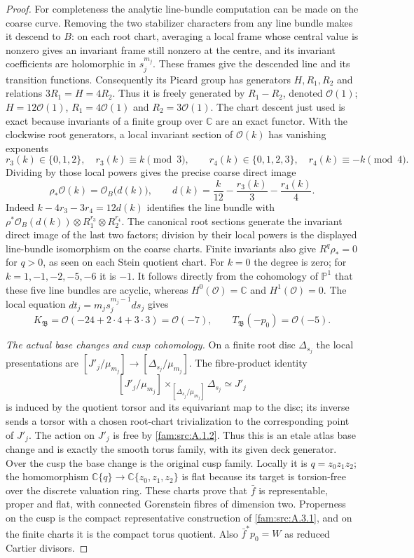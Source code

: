 \begin{proof}
For completeness the analytic line-bundle computation can be made on
the coarse curve. Removing the two stabilizer characters from any line
bundle makes it descend to $B$: on each root chart, averaging a local
frame whose central value is nonzero gives an invariant frame still
nonzero at the centre, and its invariant coefficients are holomorphic
in $s_j^{m_j}$. These frames give the descended line and its transition
functions. Consequently its Picard group has
generators $H,R_1,R_2$ and relations $3R_1=H=4R_2$.
Thus it is freely generated by $R_1-R_2$, denoted $\mathcal O(1)$;
$H=12\mathcal O(1)$, $R_1=4\mathcal O(1)$ and
$R_2=3\mathcal O(1)$. The chart descent just used is exact because
invariants of a finite group over $\mathbb C$ are an exact functor.
With the clockwise root generators, a local invariant section of
$\mathcal O(k)$ has vanishing exponents
\[
 r_3(k)\in\{0,1,2\},\quad r_3(k)\equiv k\pmod3,
 \qquad
 r_4(k)\in\{0,1,2,3\},\quad r_4(k)\equiv-k\pmod4.
\]
Dividing by those local powers gives the precise coarse direct image
\begin{equation}\label{fam:eq:ab-root-degree}
 \rho_*\mathcal O(k)=\mathcal O_B\bigl(d(k)\bigr),\qquad
 d(k)=\frac{k}{12}-\frac{r_3(k)}3-\frac{r_4(k)}4.
\end{equation}
Indeed $k-4r_3-3r_4=12d(k)$ identifies the line bundle with
$\rho^*\mathcal O_B(d(k))\otimes R_1^{r_3}\otimes R_2^{r_4}$.
The canonical root sections generate the invariant direct image of
the last two factors; division by their local powers is the displayed
line-bundle isomorphism on the coarse charts. Finite invariants also give
$R^q\rho_*=0$ for $q>0$, as seen on each Stein quotient chart.
For $k=0$ the degree is zero; for
$k=1,-1,-2,-5,-6$ it is $-1$. It follows directly from the
cohomology of $\mathbb P^1$ that these five line bundles are acyclic,
whereas $H^0(\mathcal O)=\mathbb C$ and $H^1(\mathcal O)=0$.
The local equation $dt_j=m_js_j^{m_j-1}ds_j$ gives
\[
 K_{\mathfrak B}=\mathcal O(-24+2\cdot4+3\cdot3)
 =\mathcal O(-7),\qquad
 T_{\mathfrak B}(-p_0)=\mathcal O(-5).
\]

\emph{The actual base changes and cusp cohomology.}
On a finite root disc $\Delta_{s_j}$ the local presentations are
$[J'_j/\mu_{m_j}]\to[\Delta_{s_j}/\mu_{m_j}]$.
The fibre-product identity
\[
 [J'_j/\mu_{m_j}]
 \mathbin{\times_{[\Delta_{s_j}/\mu_{m_j}]}}\Delta_{s_j}
 \simeq J'_j
\]
is induced by the quotient torsor and its equivariant map to the disc;
its inverse sends a torsor with a chosen root-chart trivialization to
the corresponding point of $J'_j$. The action on $J'_j$ is free by
\ref{fam:src:A.1.2}. Thus this is an etale atlas base change and is exactly the
smooth torus family, with its given deck generator. Over the cusp the
base change is the original cusp family. Locally it is
$q=z_0z_1z_2$; the homomorphism
$\mathbb C\{q\}\to\mathbb C\{z_0,z_1,z_2\}$ is flat because its
target is torsion-free over the discrete valuation ring.
These charts prove that $\bar f$ is representable, proper and flat,
with connected Gorenstein fibres of dimension two. Properness on the
cusp is the compact representative construction of \ref{fam:src:A.3.1}, and on the
finite charts it is the compact torus quotient. Also
$\bar f^*p_0=W$ as reduced Cartier divisors.


\end{proof}
